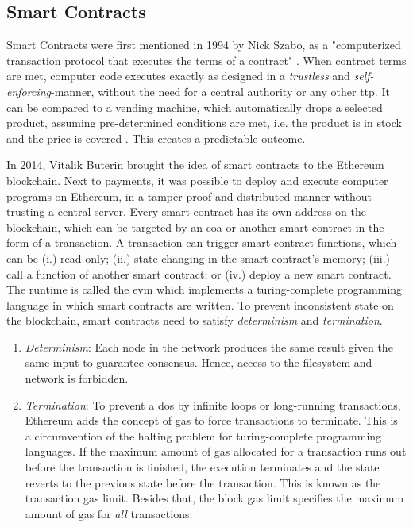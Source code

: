 \subsection{Smart Contracts}
\label{subsec:sc}

Smart Contracts were first mentioned in 1994 by Nick Szabo, as a "computerized transaction protocol that executes the terms of a contract" \cite{Szabo_1997}. When contract terms are met, computer code executes exactly as designed in a \emph{trustless} and \emph{self-enforcing}-manner, without the need for a central authority or any other \acrshort{ttp}. It can be compared to a vending machine, which automatically drops a selected product, assuming pre-determined conditions are met, i.e. the product is in stock and the price is covered \cite{Szabo_1997}. This creates a predictable outcome.

In 2014, Vitalik Buterin \cite{buterinNEXTGENERATIONSMART} brought the idea of smart contracts to the Ethereum blockchain. Next to payments, it was possible to deploy and execute computer programs on Ethereum, in a tamper-proof and distributed manner without trusting a central server. Every smart contract has its own address on the blockchain, which can be targeted by an \acrfull{eoa} or another smart contract in the form of a transaction. A transaction can trigger smart contract functions, which can be (i.) read-only; (ii.) state-changing in the smart contract's memory; (iii.) call a function of another smart contract; or (iv.) deploy a new smart contract. The runtime is called the \acrfull{evm} which implements a turing-complete programming language in which smart contracts are written. To prevent inconsistent state on the blockchain, smart contracts need to satisfy \emph{determinism} and \emph{termination}.

\begin{enumerate}
    \item \emph{Determinism}: Each node in the network produces the same result given the same input to guarantee consensus. Hence, access to the filesystem and network is forbidden.
    \item \emph{Termination}: To prevent a \acrfull{dos} by infinite loops or long-running transactions, Ethereum adds the concept of gas to force transactions to terminate. This is a circumvention of the halting problem for turing-complete programming languages. If the maximum amount of gas allocated for a transaction runs out before the transaction is finished, the execution terminates and the state reverts to the previous state before the transaction. This is known as the transaction gas limit. Besides that, the block gas limit specifies the maximum amount of gas for \emph{all} transactions.
\end{enumerate}

